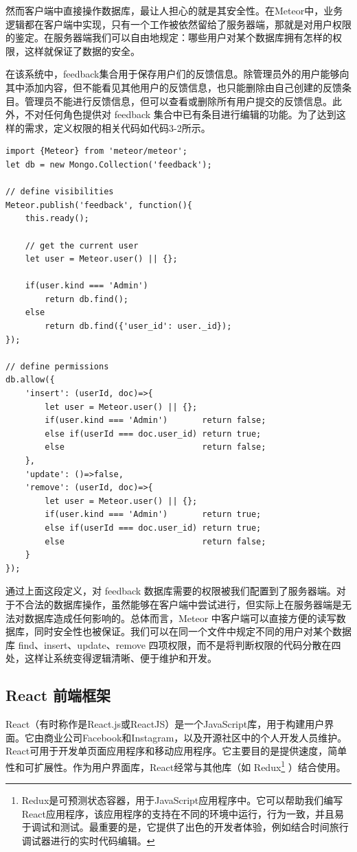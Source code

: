 然而客户端中直接操作数据库，最让人担心的就是其安全性。在Meteor中，业务逻辑都在客户端中实现，只有一个工作被依然留给了服务器端，那就是对用户权限的鉴定。在服务器端我们可以自由地规定：哪些用户对某个数据库拥有怎样的权限，这样就保证了数据的安全。

在该系统中，feedback集合用于保存用户们的反馈信息。除管理员外的用户能够向其中添加内容，但不能看见其他用户的反馈信息，也只能删除由自己创建的反馈条目。管理员不能进行反馈信息，但可以查看或删除所有用户提交的反馈信息。此外，不对任何角色提供对 feedback 集合中已有条目进行编辑的功能。为了达到这样的需求，定义权限的相关代码如代码3-2所示。

\begin{lstlisting}[title=代码 3-2：Meteor 权限控制示例]
import {Meteor} from 'meteor/meteor';
let db = new Mongo.Collection('feedback');

// define visibilities
Meteor.publish('feedback', function(){
	this.ready();
	
	// get the current user
	let user = Meteor.user() || {};
	
	if(user.kind === 'Admin')
		return db.find();
	else
		return db.find({'user_id': user._id});
});

// define permissions
db.allow({
	'insert': (userId, doc)=>{
		let user = Meteor.user() || {};
		if(user.kind === 'Admin')       return false;
		else if(userId === doc.user_id) return true;
		else                            return false;
	},
	'update': ()=>false,
	'remove': (userId, doc)=>{
		let user = Meteor.user() || {};
		if(user.kind === 'Admin')       return true;
		else if(userId === doc.user_id) return true;
		else                            return false;
	}
});
\end{lstlisting}

通过上面这段定义，对 feedback 数据库需要的权限被我们配置到了服务器端。对于不合法的数据库操作，虽然能够在客户端中尝试进行，但实际上在服务器端是无法对数据库造成任何影响的。总体而言，Meteor 中客户端可以直接方便的读写数据库，同时安全性也被保证。我们可以在同一个文件中规定不同的用户对某个数据库 find、insert、update、remove 四项权限，而不是将判断权限的代码分散在四处，这样让系统变得逻辑清晰、便于维护和开发。


\subsection{React 前端框架}

React（有时称作是React.js或ReactJS）是一个JavaScript库，用于构建用户界面。它由商业公司Facebook和Instagram，以及开源社区中的个人开发人员维护。React可用于开发单页面应用程序和移动应用程序。它主要目的是提供速度，简单性和可扩展性。作为用户界面库，React经常与其他库（如
Redux\footnote{Redux是可预测状态容器，用于JavaScript应用程序中。它可以帮助我们编写React应用程序，该应用程序的支持在不同的环境中运行，行为一致，并且易于调试和测试。最重要的是，它提供了出色的开发者体验，例如结合时间旅行调试器进行的实时代码编辑。}
）结合使用。

